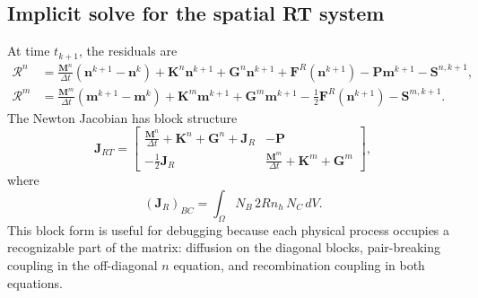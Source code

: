 \documentclass[11pt]{article}
\begin{document}
\subsection{Implicit solve for the spatial RT system}
At time $t_{k+1}$, the residuals are
\begin{align}
\mathcal{R}^n
&=\frac{\bm{M}^n}{\Delta t}(\bm{n}^{k+1}-\bm{n}^{k})
+\bm{K}^n\bm{n}^{k+1}+\bm{G}^n\bm{n}^{k+1}
+\bm{F}^{R}(\bm{n}^{k+1})
-\bm{P}\bm{m}^{k+1}-\bm{S}^{n,k+1},\\
\mathcal{R}^m
&=\frac{\bm{M}^m}{\Delta t}(\bm{m}^{k+1}-\bm{m}^{k})
+\bm{K}^m\bm{m}^{k+1}+\bm{G}^m\bm{m}^{k+1}
-\frac{1}{2}\bm{F}^{R}(\bm{n}^{k+1})
-\bm{S}^{m,k+1}.
\end{align}
The Newton Jacobian has block structure
\begin{equation}
\bm{J}_{RT}=\begin{bmatrix}
\frac{\bm{M}^n}{\Delta t}+\bm{K}^n+\bm{G}^n+\bm{J}_R & -\bm{P}\\
-\frac{1}{2}\bm{J}_R & \frac{\bm{M}^m}{\Delta t}+\bm{K}^m+\bm{G}^m
\end{bmatrix},
\end{equation}
where
\begin{equation}
(\bm{J}_R)_{BC}=\int_{\Omega}N_B\,2Rn_h\,N_C\,dV.
\end{equation}
This block form is useful for debugging because each physical process occupies a recognizable part of the matrix: diffusion on the diagonal blocks, pair-breaking coupling in the off-diagonal $n$ equation, and recombination coupling in both equations.
\end{document}
